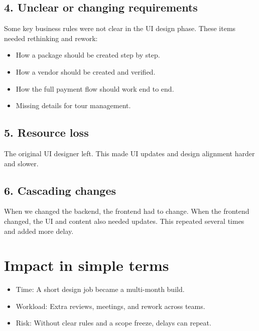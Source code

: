 \subsection*{4. Unclear or changing requirements}
Some key business rules were not clear in the UI design phase. These items needed rethinking and rework:
\begin{itemize}
  \item How a package should be created step by step.
  \item How a vendor should be created and verified.
  \item How the full payment flow should work end to end.
  \item Missing details for tour management.
\end{itemize}

\subsection*{5. Resource loss}
The original UI designer left. This made UI updates and design alignment harder and slower.

\subsection*{6. Cascading changes}
When we changed the backend, the frontend had to change. When the frontend changed, the UI and content also needed updates. This repeated several times and added more delay.

\section{Impact in simple terms}
\begin{itemize}
  \item Time: A short design job became a multi-month build.
  \item Workload: Extra reviews, meetings, and rework across teams.
  \item Risk: Without clear rules and a scope freeze, delays can repeat.
\end{itemize}


